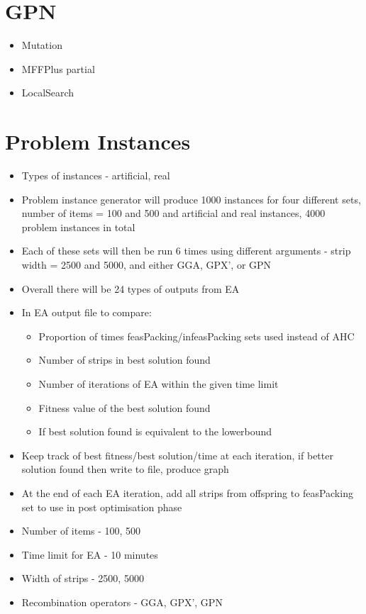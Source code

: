 \documentclass{elsarticle}
\begin{document}
\section{GPN}
\begin{itemize}
	\item Mutation
	\item MFFPlus partial
	\item LocalSearch
\end{itemize}


\section{Problem Instances}
\begin{itemize}
	\item Types of instances - artificial, real
	\item Problem instance generator will produce 1000 instances for four different sets, number of items = 100 and 500 and artificial and real instances, 4000 problem instances in total
	\item Each of these sets will then be run 6 times using different arguments - strip width = 2500 and 5000, and either GGA, GPX', or GPN
	\item Overall there will be 24 types of outputs from EA
	\item In EA output file to compare:
	\begin{itemize}
		\item Proportion of times feasPacking/infeasPacking sets used instead of AHC
		\item Number of strips in best solution found
		\item Number of iterations of EA within the given time limit
		\item Fitness value of the best solution found
		\item If best solution found is equivalent to the lowerbound
	\end{itemize}
	\item Keep track of best fitness/best solution/time at each iteration, if better solution found then write to file, produce graph
\item At the end of each EA iteration, add all strips from offspring to feasPacking set to use in post optimisation phase
\item Number of items - 100, 500
\item Time limit for EA - 10 minutes
\item Width of strips - 2500, 5000
\item Recombination operators - GGA, GPX', GPN
\end{itemize}
\end{document}
